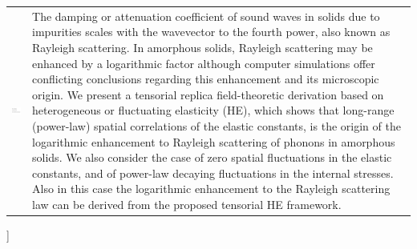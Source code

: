 \documentclass[twoside,twocolumn,9pt]{article}
\begin{document}
\begin{@twocolumnfalse}
\begin{tabular}{m{4.5cm} p{13.5cm} }
\includegraphics{head_foot/dates} & \noindent\normalsize{The damping or attenuation coefficient of sound waves in solids due to impurities scales with the wavevector to the fourth power, also known as Rayleigh scattering. In amorphous solids, Rayleigh scattering may be enhanced by a logarithmic factor although computer simulations offer conflicting conclusions regarding this enhancement and its microscopic origin. We present a tensorial replica field-theoretic derivation based on heterogeneous or fluctuating elasticity (HE), which shows that long-range (power-law) spatial correlations of the elastic constants, is the origin of the logarithmic enhancement to Rayleigh scattering of phonons in amorphous solids. We also consider the case of zero spatial fluctuations in the elastic constants, and of power-law decaying fluctuations in the internal stresses. Also in this case the logarithmic enhancement to the Rayleigh scattering law can be derived from the proposed tensorial HE framework.} \\%

\end{tabular}

 \end{@twocolumnfalse} \vspace{0.6cm}

  ]

\renewcommand*\rmdefault{bch}\normalfont\upshape
\rmfamily
\section*{}
\vspace{-1cm}



\end{document}
